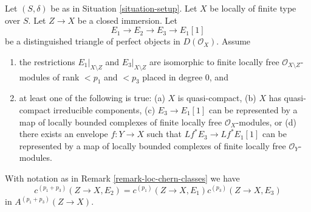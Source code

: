 \begin{lemma}
\label{lemma-additivity-loc-chern-c}
Let $(S, \delta)$ be as in Situation \ref{situation-setup}.
Let $X$ be locally of finite type over $S$. Let $Z \to X$ be
a closed immersion. Let
$$
E_1 \to E_2 \to E_3 \to E_1[1]
$$
be a distinguished triangle of perfect objects in $D(\mathcal{O}_X)$.
Assume
\begin{enumerate}
\item the restrictions $E_1|_{X \setminus Z}$ and $E_3|_{X \setminus Z}$
are isomorphic to finite locally free $\mathcal{O}_{X \setminus Z}$-modules
of rank $< p_1$ and $< p_3$ placed in degree $0$, and
\item at least one of the following is true:
(a) $X$ is quasi-compact,
(b) $X$ has quasi-compact irreducible components,
(c) $E_3 \to E_1[1]$ can be represented by a map of locally
bounded complexes of finite locally free $\mathcal{O}_X$-modules, or
(d) there exists an envelope $f : Y \to X$ such that $Lf^*E_3 \to Lf^*E_1[1]$
can be represented by a map of locally bounded complexes of
finite locally free $\mathcal{O}_Y$-modules.
\end{enumerate}
With notation as in Remark \ref{remark-loc-chern-classes} we have
$$
c^{(p_1 + p_3)}(Z \to X, E_2) = c^{(p_1)}(Z \to X, E_1)c^{(p_3)}(Z \to X, E_3)
$$
in $A^{(p_1 + p_3)}(Z \to X)$.
\end{lemma}

